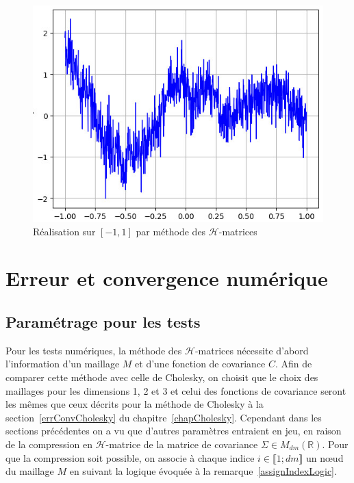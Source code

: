 \begin{figure}[h]
\begin{center}
\includegraphics[scale=0.45]{images/hmatrixRea.jpg}
\caption{Réalisation sur $[-1,1]$ par méthode des $\mathcal{H}$-matrices}
\label{figHmatrixRea}  
\end{center}
\end{figure}

\newpage
\section{Erreur et convergence numérique}
\label{hmatrixerrconv}


\subsection{Paramétrage pour les tests}

Pour les tests numériques, la méthode des $\mathcal{H}$-matrices nécessite d'abord
l'information d'un maillage $M$ et d'une fonction de covariance $C$. Afin de comparer
cette méthode avec celle de Cholesky, on choisit que le choix des maillages pour
les dimensions 1, 2 et 3 et celui des fonctions de covariance seront les mêmes que ceux décrits
pour la méthode de Cholesky à la section~\ref{errConvCholesky} du chapitre~\ref{chapCholesky}. Cependant dans les sections précédentes on a vu que d'autres paramètres entraient en jeu,
en raison de la compression en $\mathcal{H}$-matrice de la
matrice de covariance $\Sigma \in M_{dm}(\mathbb{R})$. Pour que la compression soit possible, on
associe à chaque indice $i \in \llbracket 1;dm \rrbracket$ un n\oe ud du maillage $M$ en suivant la logique évoquée à la remarque~\ref{assignIndexLogic}. \\

